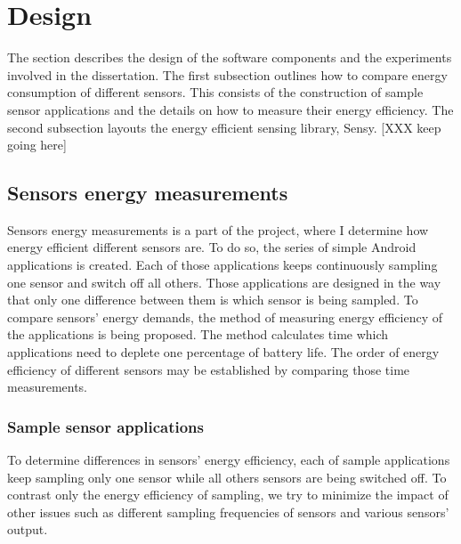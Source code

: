 \section{Design}
\label{s:design}
The section describes the design of the software components and the experiments involved in the dissertation. The first subsection outlines how to compare energy consumption of different sensors. This consists of the construction of sample sensor applications and the details on how to measure their energy efficiency.  The second subsection layouts the energy efficient sensing library, Sensy. [XXX keep going here]

\subsection{Sensors energy measurements}
\label{s:design:measurements}
Sensors energy measurements is a part of the project, where I determine how energy efficient different sensors are. To do so, the series of simple Android applications is created. Each of those applications keeps continuously sampling one sensor and switch off all others. Those applications are designed in the way that only one difference between them is which sensor is being sampled. To compare sensors' energy demands, the method of measuring energy efficiency of the applications is being proposed. The method calculates time which applications need to deplete one percentage of battery life. The order of energy efficiency of different sensors may be established by comparing those time measurements.

\subsubsection{Sample sensor applications}
\label{s:design:measurements:sampleapps}
To determine differences in sensors' energy efficiency, each of sample applications keep sampling only one sensor while all others sensors are being switched off. To contrast only the energy efficiency of sampling, we try to minimize the impact of other issues such as different sampling frequencies of sensors and various sensors' output.

